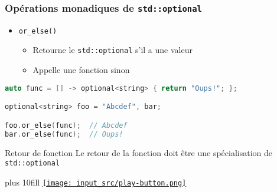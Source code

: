 \documentclass[C++.tex]{subfiles}
\begin{document}
\begin{frame}[fragile]
	\frametitle{Opérations monadiques de \lstinline|std::optional|}
	\begin{itemize}
		\item \lstinline|or_else()| 
		\begin{itemize}
			\item Retourne le \lstinline|std::optional| s'il a une valeur
			\item Appelle une fonction sinon
		\end{itemize}
	\end{itemize}

	\begin{lstlisting}[language=C++]
auto func = [] -> optional<string> { return "Oups!"; };

optional<string> foo = "Abcdef", bar;

foo.or_else(func);	// Abcdef
bar.or_else(func);	// Oups!\end{lstlisting}

	\begin{alertblock}{Retour de fonction}
		Le retour de la fonction doit être une spécialisation de \lstinline|std::optional|
	\end{alertblock}

	\vskip 10mm plus 10fill
	\hfill
	\href{https://godbolt.org/#g:!((g:!((g:!((h:codeEditor,i:(filename:'1',fontScale:14,fontUsePx:'0',j:1,lang:c%2B%2B,selection:(endColumn:1,endLineNumber:30,positionColumn:1,positionLineNumber:30,selectionStartColumn:1,selectionStartLineNumber:1,startColumn:1,startLineNumber:1),source:'%23include+%3Ciostream%3E%0A%23include+%3Coptional%3E%0A%23include+%3Cstring%3E%0A%0Aint+main()%0A%7B%0A++%7B%0A++++std::optional%3Cstd::string%3E+foo+%3D+%22Abcdef%22%3B%0A++++auto+bar+%3D+foo.transform(%5B%5D(auto%26%26+s)+%7B+return+s.size()%3B+%7D)%3B%0A%0A++++std::cout+%3C%3C+(bar+%3F+*bar+:+0)+%3C%3C+%22%5Cn%22%3B%0A++%7D%0A%0A++%7B%0A++++auto+func+%3D+%5B%5D+(int+i)+-%3E+std::optional%3Cint%3E+%7B+return+2+*+i%3B+%7D%3B%0A++++std::optional%3Cint%3E+foo+%3D+42%3B%0A++++auto+bar+%3D+foo.and_then(func)%3B%0A%0A++++std::cout+%3C%3C++(bar+%3F+*bar+:+0)+%3C%3C+%22%5Cn%22%3B%0A++%7D%0A%0A++%7B%0A++++auto+func+%3D+%5B%5D+-%3E+std::optional%3Cstd::string%3E+%7B+return+%22Oups!!%22%3B+%7D%3B%0A++++std::optional%3Cstd::string%3E+foo+%3D+%22Abcdef%22%3B%0A++++auto+bar+%3D+foo.or_else(func)%3B%0A%0A++++std::cout+%3C%3C+*bar+%3C%3C+%22%5Cn%22%3B%0A++%7D%0A%7D%0A'),l:'5',n:'0',o:'C%2B%2B+source+%231',t:'0')),k:50,l:'4',n:'0',o:'',s:0,t:'0'),(g:!((h:executor,i:(argsPanelShown:'1',compilationPanelShown:'0',compiler:g122,compilerName:'',compilerOutShown:'0',execArgs:'',execStdin:'',fontScale:14,fontUsePx:'0',j:1,lang:c%2B%2B,libs:!(),options:'-std%3Dc%2B%2B23+-Wall+-Wextra+-pedantic',source:1,stdinPanelShown:'1',wrap:'1'),l:'5',n:'0',o:'Executor+x86-64+gcc+12.2+(C%2B%2B,+Editor+%231)',t:'0')),header:(),k:50,l:'4',n:'0',o:'',s:0,t:'0')),l:'2',n:'0',o:'',t:'0')),version:4}{\texttt{[image: input\_src/play-button.png]}}
\end{frame}
\end{document}
